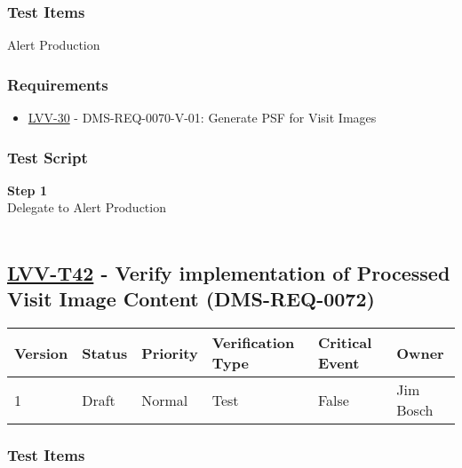 \hypertarget{test-items-17}{%
\subsubsection{Test Items}\label{test-items-17}}

Alert Production~

\hypertarget{requirements-18}{%
\subsubsection{Requirements}\label{requirements-18}}

\begin{itemize}
\tightlist
\item
  \href{https://jira.lsstcorp.org/browse/LVV-30}{LVV-30} -
  DMS-REQ-0070-V-01: Generate PSF for Visit Images
\end{itemize}

\hypertarget{test-script-18}{%
\subsubsection{Test Script}\label{test-script-18}}

\textbf{Step 1}\\
Delegate to Alert Production\\
~\\

\hypertarget{lvv-t42---verify-implementation-of-processed-visit-image-content-dms-req-0072}{%
\subsection{\texorpdfstring{\href{https://jira.lsstcorp.org/secure/Tests.jspa\#/testCase/LVV-T42}{LVV-T42}
- Verify implementation of Processed Visit Image Content
(DMS-REQ-0072)}{LVV-T42 - Verify implementation of Processed Visit Image Content (DMS-REQ-0072)}}\label{lvv-t42---verify-implementation-of-processed-visit-image-content-dms-req-0072}}

\begin{longtable}[]{@{}llllll@{}}
\toprule
Version & Status & Priority & Verification Type & Critical Event &
Owner\tabularnewline
\midrule
\endhead
1 & Draft & Normal & Test & False & Jim Bosch\tabularnewline
\bottomrule
\end{longtable}

\hypertarget{test-items-18}{%
\subsubsection{Test Items}\label{test-items-18}}

